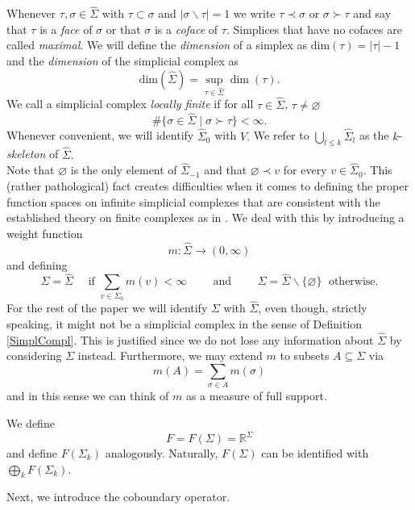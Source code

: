 \documentclass[10pt]{amsart}
\theoremstyle{definition}
\newcommand{\F}{{F}}
\begin{document}
 Whenever $\tau,\sigma\in\hat\Sigma$ with $\tau\subset\sigma$ and $\vert\sigma\backslash\tau\vert = 1$ we write $\tau\prec\sigma$ or $\sigma\succ \tau$ and say that $\tau$ is a \textit{face} of $\sigma$ or that $\sigma$ is a \textit{coface} of $\tau.$ Simplices that have no cofaces are called \textit{maximal}. We will define the \textit{dimension} of a simplex as $\mathrm{dim}(\tau)=\vert\tau\vert-1$ and the \emph{dimension} of the simplicial complex as
 \begin{equation*}
 	\mathrm{dim}(\hat\Sigma) =\sup_{\tau\in \hat\Sigma}\dim(\tau).
 \end{equation*}
 We call a simplicial complex \emph{locally finite} if for all $\tau\in\hat\Sigma$, $\tau\neq\varnothing$
 \begin{equation*}
 	\#\{\sigma\in\hat\Sigma\mid \sigma\succ \tau\}<\infty.
 \end{equation*}
 Whenever convenient, we will identify $\hat\Sigma_0$ with $V.$ We refer to $\bigcup_{l\leq k}\hat{\Sigma}_l$ as the $k$-\textit{skeleton} of $\hat\Sigma.$\\
 Note that $\varnothing$ is the only element of $\hat\Sigma_{-1}$ and that $\varnothing\prec v$ for every $v\in\hat\Sigma_0.$ This (rather pathological) fact creates difficulties when it comes to defining the proper function spaces on infinite simplicial complexes that are consistent with the established theory on finite complexes as in \cite{GundertWagner,HJ}. 
 We deal with this by introducing a weight function $$m:\hat\Sigma\rightarrow(0,\infty)$$ and defining $$\Sigma = \hat\Sigma\quad\mbox{ if }\sum_{v\in \Sigma_{0}}m(v)<\infty\qquad\mbox{ and }\qquad\Sigma = \hat\Sigma\backslash\lbrace\varnothing\rbrace\;\mbox{ otherwise}.$$ For the rest of the paper we will identify $\Sigma$ with $\hat\Sigma$, even though, strictly speaking, it might not be a simplicial complex in the sense of Definition \ref{SimplCompl}. This is justified since we do not lose any information about $\hat\Sigma$ by considering $\Sigma$ instead. Furthermore, we may extend $m$ to subsets $A\subseteq \Sigma$ via
 \begin{equation*}
 	m(A)=\sum_{\sigma\in A}m(\sigma)
 \end{equation*}
 and in this sense we can think of $m$ as a measure of full support.
 
We define $$F = F(\Sigma) = \mathbb{R}^\Sigma$$
and  define $\F(\Sigma_k)$ analogously.
Naturally, $\F(\Sigma)$ can be identified with $\bigoplus_{k}\F(\Sigma_k).$ 

Next, we introduce the coboundary operator.
\end{document}
